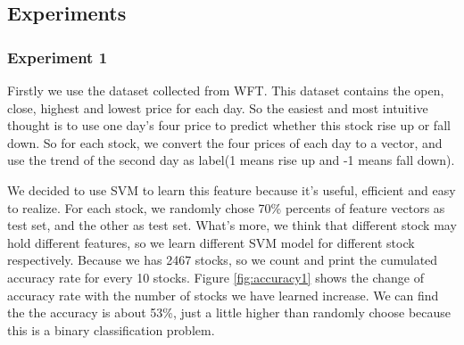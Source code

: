 \subsection{Experiments}
\subsubsection{Experiment 1}
Firstly we use the dataset collected from WFT. This dataset contains the open, close, highest and lowest price for each day. So the easiest and most intuitive thought is to use one day's four price to predict whether this stock rise up or fall down. So for each stock, we convert the four prices of each day to a vector, and use the trend of the second day as label(1 means rise up and -1 means fall down).

We decided to use SVM to learn this feature because it's useful, efficient and easy to realize. For each stock, we randomly chose 70\% percents of feature vectors as test set, and the other as test set. What's more, we think that different stock may hold different features, so we learn different SVM model for different stock respectively. Because we has 2467 stocks, so we count and print the cumulated accuracy rate for every 10 stocks. Figure \ref{fig:accuracy1} shows the change of accuracy rate with the number of stocks we have learned increase. We can find the the accuracy is about 53\%, just a little higher than randomly choose because this is a binary classification problem.

